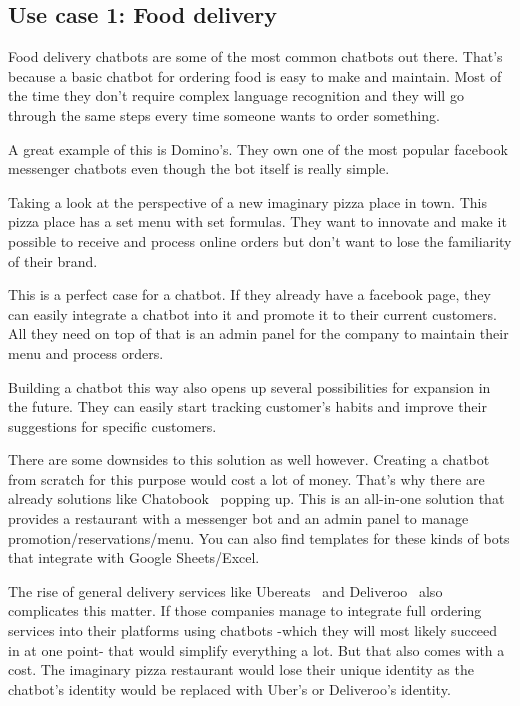 \subsection{Use case 1: Food delivery}

Food delivery chatbots are some of the most common chatbots out there. That's because a basic chatbot for ordering food is easy to make and maintain. Most of the time they don't require complex language recognition and they will go through the same steps every time someone wants to order something.

A great example of this is Domino's. They own one of the most popular facebook messenger chatbots even though the bot itself is really simple.

Taking a look at the perspective of a new imaginary pizza place in town. This pizza place has a set menu with set formulas. They want to innovate and make it possible to receive and process online orders but don't want to lose the familiarity of their brand.

This is a perfect case for a chatbot. If they already have a facebook page, they can easily integrate a chatbot into it and promote it to their current customers. All they need on top of that is an admin panel for the company to maintain their menu and process orders.

Building a chatbot this way also opens up several possibilities for expansion in the future. They can easily start tracking customer's habits and improve their suggestions for specific customers.

There are some downsides to this solution as well however. Creating a chatbot from scratch for this purpose would cost a lot of money. That's why there are already solutions like Chatobook~\cite{chatobook} popping up. This is an all-in-one solution that provides a restaurant with a messenger bot and an admin panel to manage promotion/reservations/menu. You can also find templates for these kinds of bots that integrate with Google Sheets/Excel.~\cite{chatbot-templates-pizza}

The rise of general delivery services like Ubereats~\cite{ubereats} and Deliveroo~\cite{deliveroo} also complicates this matter. If those companies manage to integrate full ordering services into their platforms using chatbots -which they will most likely succeed in at one point- that would simplify everything a lot. But that also comes with a cost. The imaginary pizza restaurant would lose their unique identity as the chatbot's identity would be replaced with Uber's or Deliveroo's identity.

